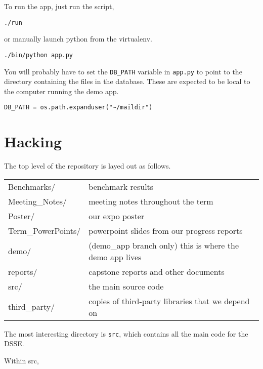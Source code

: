 To run the app, just run the script,

\begin{lstlisting}
./run
\end{lstlisting}

or manually launch python from the virtualenv.

\begin{lstlisting}
./bin/python app.py
\end{lstlisting}

You will probably have to set the \texttt{DB\_PATH} variable in \texttt{app.py}
to point to the directory containing the files in the database.
These are expected to be local to the computer running the demo app.

\begin{lstlisting}
DB_PATH = os.path.expanduser("~/maildir")
\end{lstlisting}

\section{Hacking}

The top level of the repository is layed out as follows.

\begin{center}
\begin{tabular}{ll}
    Benchmarks/         & benchmark results \\
    Meeting\_Notes/      & meeting notes throughout the term \\
    Poster/             & our expo poster \\
    Term\_PowerPoints/   & powerpoint slides from our progress reports \\
    demo/               & (demo\_app branch only) this is where the demo app lives \\
    reports/            & capstone reports and other documents \\
    src/                & the main source code \\
    third\_party/        & copies of third-party libraries that we depend on \\
\end{tabular}
\end{center}

The most interesting directory is \texttt{src}, which contains all the main code for the DSSE.


Within src,

